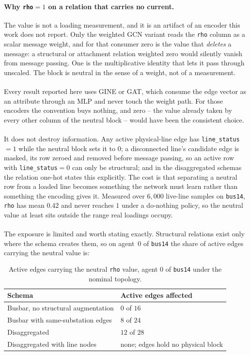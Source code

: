 {\color{clarif}
\paragraph{Why \texttt{rho}$=1$ on a relation that carries no current.}
The value is not a loading measurement, and it is an artifact of an encoder this
work does not report. Only the weighted GCN variant reads the \texttt{rho}
column as a scalar message weight, and for that consumer zero is the value that
\emph{deletes} a message: a structural or attachment relation weighted zero
would silently vanish from message passing. One is the multiplicative identity
that lets it pass through unscaled. The block is neutral in the sense of a
weight, not of a measurement.
\\
\\
Every result reported here uses GINE or GAT, which consume the edge vector as an
attribute through an MLP and never touch the weight path. For those encoders the
convention buys nothing, and zero -- the value already taken by every other
column of the neutral block -- would have been the consistent choice.
\\
\\
It does not destroy information. Any active physical-line edge has
\texttt{line\_status}$=1$ while the neutral block sets it to $0$; a disconnected
line's candidate edge is masked, its row zeroed and removed before message
passing, so an active row with \texttt{line\_status}$=0$ can only be structural;
and in the disaggregated schemas the relation one-hot states this explicitly.
The cost is that separating a neutral row from a loaded line becomes something
the network must learn rather than something the encoding gives it. Measured
over $6{,}000$ live-line samples on \texttt{bus14}, \texttt{rho} has mean $0.42$
and never reaches $1$ under a do-nothing policy, so the neutral value at least
sits outside the range real loadings occupy.
\\
\\
The exposure is limited and worth stating exactly. Structural relations exist
only where the schema creates them, so on agent~$0$ of \texttt{bus14} the share
of active edges carrying the neutral value is:

\begin{table}[H]
  \centering
  \small
  \caption{Active edges carrying the neutral \texttt{rho} value, agent $0$ of
  \texttt{bus14} under the nominal topology.}
  \label{tab:neutral-rho-exposure}
  \setlength{\tabcolsep}{6pt}
  \begin{tabular}{L{0.42\textwidth}L{0.30\textwidth}}
    \toprule
    Schema & Active edges affected \\
    \midrule
    Busbar, no structural augmentation & $0$ of $16$ \\
    Busbar with same-substation edges & $8$ of $24$ \\
    Disaggregated & $12$ of $28$ \\
    Disaggregated with line nodes & none; edges hold no physical block \\
    \bottomrule
  \end{tabular}
\end{table}

}

